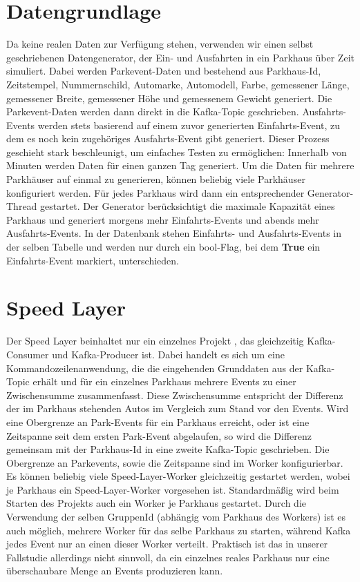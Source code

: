\section{Datengrundlage}
Da keine realen Daten zur Verfügung stehen, verwenden wir einen selbst geschriebenen Datengenerator, der Ein- und Ausfahrten in ein Parkhaus über Zeit simuliert.
Dabei werden Parkevent-Daten  und  bestehend aus Parkhaus-Id, Zeitstempel, Nummernschild, Automarke, Automodell, Farbe, gemessener Länge, gemessener Breite, gemessener Höhe und gemessenem Gewicht generiert.
Die Parkevent-Daten werden dann direkt in die Kafka-Topic  geschrieben.
Ausfahrts-Events werden stets basierend auf einem zuvor generierten Einfahrts-Event, zu dem es noch kein zugehöriges Ausfahrts-Event gibt generiert.
Dieser Prozess geschieht stark beschleunigt, um einfaches Testen zu ermöglichen: Innerhalb von Minuten werden Daten für einen ganzen Tag generiert.
Um die Daten für mehrere Parkhäuser auf einmal zu generieren, können beliebig viele Parkhäuser konfiguriert werden.
Für jedes Parkhaus wird dann ein entsprechender Generator-Thread gestartet.
Der Generator berücksichtigt die maximale Kapazität eines Parkhaus und generiert morgens mehr Einfahrts-Events und abends mehr Ausfahrts-Events.
In der Datenbank stehen Einfahrts- und Ausfahrts-Events in der selben Tabelle und werden nur durch ein bool-Flag, bei dem \textbf{True} ein Einfahrts-Event markiert, unterschieden.


\section{Speed Layer}
Der Speed Layer beinhaltet nur ein einzelnes Projekt , das gleichzeitig Kafka-Consumer und Kafka-Producer ist.
Dabei handelt es sich um eine Kommandozeilenanwendung, die die eingehenden Grunddaten aus der Kafka-Topic  erhält und für ein einzelnes Parkhaus mehrere Events zu einer Zwischensumme zusammenfasst.
Diese Zwischensumme entspricht der Differenz der im Parkhaus stehenden Autos im Vergleich zum Stand vor den Events.
Wird eine Obergrenze an Park-Events für ein Parkhaus erreicht, oder ist eine Zeitspanne seit dem ersten Park-Event abgelaufen, so wird die Differenz gemeinsam mit der Parkhaus-Id in eine zweite Kafka-Topic  geschrieben.
Die Obergrenze an Parkevents, sowie die Zeitspanne sind im Worker konfigurierbar.
Es können beliebig viele Speed-Layer-Worker gleichzeitig gestartet werden, wobei je Parkhaus ein Speed-Layer-Worker vorgesehen ist.
Standardmäßig wird beim Starten des Projekts auch ein Worker je Parkhaus gestartet.
Durch die Verwendung der selben GruppenId (abhängig vom Parkhaus des Workers) ist es auch möglich, mehrere Worker für das selbe Parkhaus zu starten, während Kafka jedes Event nur an einen dieser Worker verteilt.
Praktisch ist das in unserer Fallstudie allerdings nicht sinnvoll, da ein einzelnes reales Parkhaus nur eine überschaubare Menge an Events produzieren kann.


